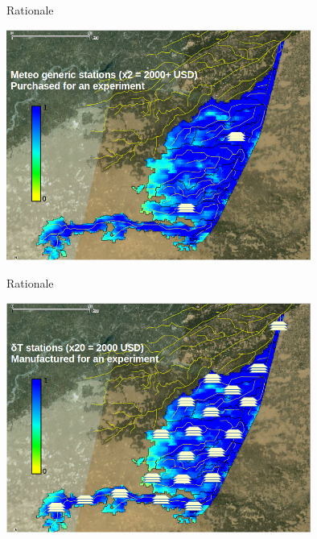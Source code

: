 \documentclass[xcolor=dvipsnames,beamer]{beamer} %
\begin{document}
\begin{frame}[fragile]{Rationale}

\begin{center}
  \includegraphics[width=10cm]{MWS_v1_deltaT_rationale_1}
\end{center}

\end{frame}

\begin{frame}[fragile]{Rationale}

\begin{center}
  \includegraphics[width=10cm]{MWS_v1_deltaT_rationale_2}
\end{center}

\end{frame}
\end{document}
